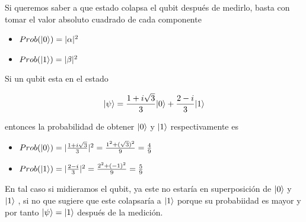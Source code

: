 Si queremos saber a que estado colapsa el qubit después de medirlo, basta con tomar el valor absoluto cuadrado de cada componente

\begin{itemize}
	\item $ Prob(|0\rangle) = |\alpha|^2 $
	\item $ Prob(|1\rangle) = |\beta|^2 $
\end{itemize}

\begin{example}\label{eje2-6}
	
	Si un qubit esta en el estado
	
	$$|\psi\rangle = \frac{1+i\sqrt{3}}{3}|0\rangle + \frac{2-i}{3}|1\rangle$$
	
	entonces la probabilidad de obtener $|0\rangle$ y $|1\rangle$ respectivamente es
	
	\begin{itemize}
		\item $ Prob(|0\rangle) = |\frac{1+i\sqrt{3}}{3}|^2 = \frac{1^2+(\sqrt{3})^2}{9} =\frac{4}{9} $
		\item $ Prob(|1\rangle) = |\frac{2-i}{3}|^2 = \frac{2^2+(-1)^2}{9} = \frac{5}{9}$
	\end{itemize}
	
	
\end{example}

En tal caso si midieramos el qubit, ya este no estaría en superposición de $|0\rangle$ y $|1\rangle$ , si no que sugiere que este colapsaría a $|1\rangle$ porque su probabiidad es mayor y por tanto $|\psi\rangle=|1\rangle$ después de la medición.


